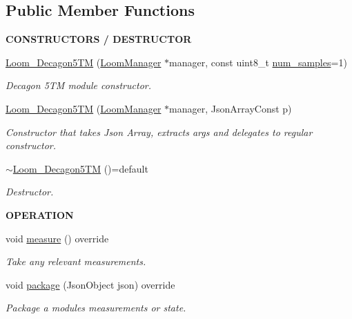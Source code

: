 \subsection*{Public Member Functions}
\begin{Indent}{\bf C\+O\+N\+S\+T\+R\+U\+C\+T\+O\+RS / D\+E\+S\+T\+R\+U\+C\+T\+OR}\par
\begin{DoxyCompactItemize}
\item 
\hyperlink{class_loom___decagon5_t_m_aba301a3eb68042c4672a2e8d4e45f7e4}{Loom\+\_\+\+Decagon5\+TM} (\hyperlink{class_loom_manager}{Loom\+Manager} $\ast$manager, const uint8\+\_\+t \hyperlink{class_loom_sensor_a0e74ebbaecde15ed1c71e1bb6bc6aebe}{num\+\_\+samples}=1)
\begin{DoxyCompactList}\small\item\em Decagon 5\+TM module constructor. \end{DoxyCompactList}\item 
\hyperlink{class_loom___decagon5_t_m_a3cace9c9b95e371de5cf2b6e0cce6f2d}{Loom\+\_\+\+Decagon5\+TM} (\hyperlink{class_loom_manager}{Loom\+Manager} $\ast$manager, Json\+Array\+Const p)
\begin{DoxyCompactList}\small\item\em Constructor that takes Json Array, extracts args and delegates to regular constructor. \end{DoxyCompactList}\item 
\hyperlink{class_loom___decagon5_t_m_ab3481be7e60cfd04f36ada4c77116981}{$\sim$\+Loom\+\_\+\+Decagon5\+TM} ()=default
\begin{DoxyCompactList}\small\item\em Destructor. \end{DoxyCompactList}\end{DoxyCompactItemize}
\end{Indent}
\begin{Indent}{\bf O\+P\+E\+R\+A\+T\+I\+ON}\par
\begin{DoxyCompactItemize}
\item 
void \hyperlink{class_loom___decagon5_t_m_abca841a531450535673786a5c6156084}{measure} () override
\begin{DoxyCompactList}\small\item\em Take any relevant measurements. \end{DoxyCompactList}\item 
void \hyperlink{class_loom___decagon5_t_m_ac3bd11e1e2fb49b330d355778118886e}{package} (Json\+Object json) override
\begin{DoxyCompactList}\small\item\em Package a modules measurements or state. \end{DoxyCompactList}\end{DoxyCompactItemize}
\end{Indent}
